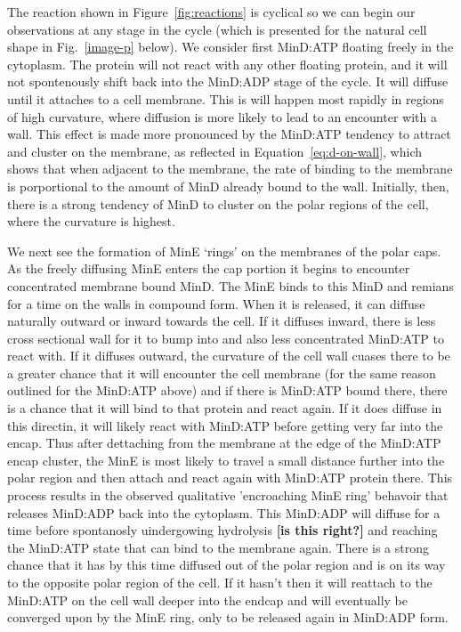 \documentclass[letterpaper,twocolumn,amsmath,amssymb,pre]{revtex4-1}
\newcommand{\red}[1]{{\bf \color{red} #1}}
\newcommand{\fixme}[1]{\red{[#1]}}
\begin{document}
The reaction shown in Figure~\ref{fig:reactions} is cyclical so we can
begin our observations at any stage in the cycle (which is presented
for the natural cell shape in Fig.~\ref{image-p} below).  We consider
first MinD:ATP floating freely in the cytoplasm.  The protein will not
react with any other floating protein, and it will not spontenously
shift back into the MinD:ADP stage of the cycle.  It will diffuse
until it attaches to a cell membrane.  This is will happen most
rapidly in regions of high curvature, where diffusion is more likely
to lead to an encounter with a wall.  This effect is made more
pronounced by the MinD:ATP tendency to attract and cluster on the
membrane, as reflected in Equation~\ref{eq:d-on-wall}, which shows
that when adjacent to the membrane, the rate of binding to the
membrane is porportional to the amount of MinD already bound to the
wall.  Initially, then, there is a strong tendency of MinD to cluster
on the polar regions of the cell, where the curvature is highest.

We next see the formation of MinE `rings' on the membranes of the
polar caps.  As the freely diffusing MinE enters the cap portion it
begins to encounter concentrated membrane bound MinD.  The MinE binds
to this MinD and remians for a time on the walls in compound form.
When it is released, it can diffuse naturally outward or inward
towards the cell.  If it diffuses inward, there is less cross
sectional wall for it to bump into and also less concentrated MinD:ATP
to react with.  If it diffuses outward, the curvature of the cell wall
cuases there to be a greater chance that it will encounter the cell
membrane (for the same reason outlined for the MinD:ATP above) and if
there is MinD:ATP bound there, there is a chance that it will bind to
that protein and react again.  If it does diffuse in this directin, it
will likely react with MinD:ATP before getting very far into the
encap.  Thus after dettaching from the membrane at the edge of the
MinD:ATP encap cluster, the MinE is most likely to travel a small
distance further into the polar region and then attach and react again
with MinD:ATP protein there.  This process results in the observed
qualitative 'encroaching MinE ring' behavoir that releases MinD:ADP
back into the cytoplasm.  This MinD:ADP will diffuse for a time before
spontanosly uindergowing hydrolysis \fixme{is this right?} and
reaching the MinD:ATP state that can bind to the membrane again.
There is a strong chance that it has by this time diffused out of the
polar region and is on its way to the opposite polar region of the
cell.  If it hasn't then it will reattach to the MinD:ATP on the cell
wall deeper into the endcap and will eventually be converged upon by
the MinE ring, only to be released again in MinD:ADP form.
\end{document}
